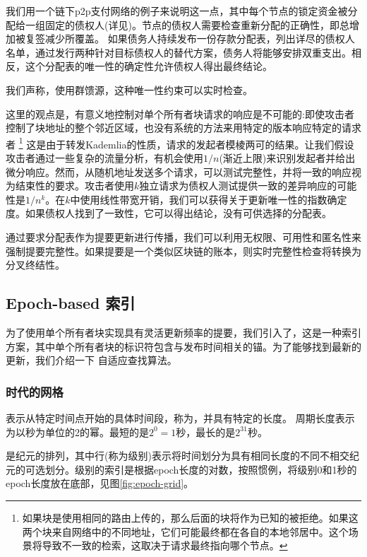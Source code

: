 我们用一个链下p2p支付网络的例子来说明这一点，其中每个节点的锁定资金被分配给一组固定的债权人(详见\cite{ethersphere2019swap})。节点的债权人需要检查重新分配的正确性，即总增加被复签减少所覆盖。
如果债务人持续发布一份存款分配表，列出详尽的债权人名单，通过发行两种针对目标债权人的替代方案，债务人将能够安排双重支出。相反，这个分配表的唯一性的确定性允许债权人得出最终结论。

我们声称，使用群馈源，这种唯一性约束可以实时检查。

这里的观点是，有意义地控制对单个所有者块请求的响应是不可能的:即使攻击者控制了块地址的整个邻近区域，也没有系统的方法来用特定的版本响应特定的请求者
%
\footnote{如果块是使用相同的路由上传的，那么后面的块将作为已知的被拒绝。如果这两个块来自网络中的不同地址，它们可能最终都在各自的本地邻居中。这个场景将导致不一致的检索，这取决于请求最终指向哪个节点。}
%
这是由于转发Kademlia的性质，请求的发起者模棱两可的结果。让我们假设攻击者通过一些复杂的流量分析，有机会使用$1/n$(渐近上限)来识别发起者并给出微分响应。然而，从随机地址发送多个请求，可以测试完整性，并将一致的响应视为结束性的要求。攻击者使用$k$独立请求为债权人测试提供一致的差异响应的可能性是$1/n^k$。在$k$中使用线性带宽开销，我们可以获得关于更新唯一性的指数确定度。如果债权人找到了一致性，它可以得出结论，没有可供选择的分配表。


通过要求分配表作为提要更新进行传播，我们可以利用无权限、可用性和匿名性来强制提要完整性。如果提要是一个类似区块链的账本，则实时完整性检查将转换为分叉终结性。 


\subsection{Epoch-based
索引\statusyellow}\label{sec:epoch-based-feeds}

\yellow{}

为了使用单个所有者块实现具有灵活更新频率的提要，我们引入了，这是一种索引方案，其中单个所有者块的标识符包含与发布时间相关的锚。为了能够找到最新的更新，我们介绍一下
自适应查找算法。 

\subsubsection{时代的网格}

表示从特定时间点开始的具体时间段，称为，并具有特定的长度。
周期长度表示为以秒为单位的2的幂。最短的是$2^0 = 1$秒，最长的是$2^{31}$秒。

是纪元的排列，其中行(称为级别)表示将时间划分为具有相同长度的不同不相交纪元的可选划分。级别的索引是根据epoch长度的对数，按照惯例，将级别0和1秒的epoch长度放在底部，见图\ref{fig:epoch-grid}。

